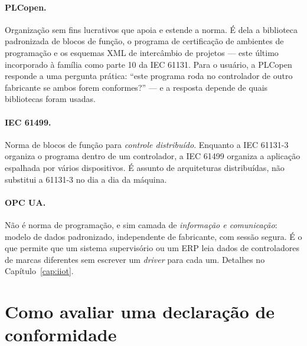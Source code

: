 \paragraph{PLCopen.} Organização sem fins lucrativos que apoia e estende a norma. É dela a
biblioteca padronizada de blocos de função, o programa de certificação de ambientes de programação e
os esquemas XML de intercâmbio de projetos --- este último incorporado à família como parte 10 da
IEC 61131. Para o usuário, a PLCopen responde a uma pergunta prática: ``este programa roda no
controlador de outro fabricante se ambos forem conformes?'' --- e a resposta depende de quais
bibliotecas foram usadas.

\paragraph{IEC 61499.} Norma de blocos de função para \emph{controle distribuído}. Enquanto a IEC
61131-3 organiza o programa dentro de um controlador, a IEC 61499 organiza a aplicação espalhada por
vários dispositivos. É assunto de arquiteturas distribuídas, não substitui a 61131-3 no dia a dia da
máquina.

\paragraph{OPC UA.} Não é norma de programação, e sim camada de \emph{informação e comunicação}:
modelo de dados padronizado, independente de fabricante, com sessão segura. É o que permite que um
sistema supervisório ou um ERP leia dados de controladores de marcas diferentes sem escrever um
\emph{driver} para cada um. Detalhes no Capítulo~\ref{cap:iiot}.

\section{Como avaliar uma declaração de conformidade}

